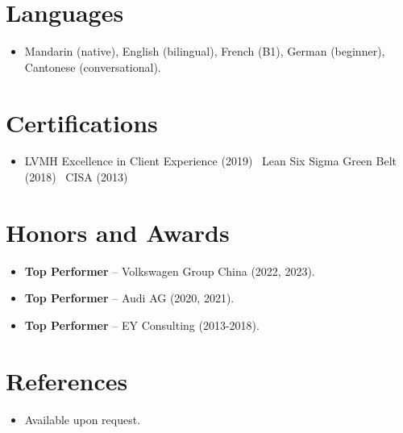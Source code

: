 \documentclass[11pt,a4paper,sans]{moderncv}
\begin{document}

\section{Languages}
\vspace{1pt}
\begin{itemize}
\item Mandarin (native), English (bilingual), French (B1), German (beginner), Cantonese (conversational).
\end{itemize}


\section{Certifications}
\vspace{1pt}
\begin{itemize}
\item LVMH Excellence in Client Experience (2019) \textbar\ Lean Six Sigma Green Belt (2018) \textbar\ CISA (2013)
\end{itemize}


\section{Honors and Awards}
\vspace{1pt}
\begin{itemize}
\item{\textbf{Top Performer} -- Volkswagen Group China (2022, 2023).}
\item{\textbf{Top Performer} -- Audi AG (2020, 2021).}
\item{\textbf{Top Performer} -- EY Consulting (2013-2018).}
\end{itemize}


\section{References}
\vspace{1pt}
\begin{itemize}
\item{Available upon request.}
\end{itemize}
\end{document}
